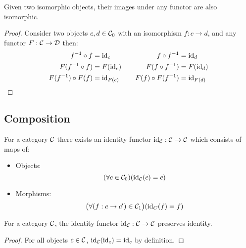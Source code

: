\begin{theorem}\label{thm:isomorphism_functor}

  Given two isomorphic objects, their images under any functor are also
  isomorphic.

  \begin{proof}
    Consider two objects $c,d \in \mathcal{C}_0$ with an isomorphism $f: c\to d$, and any
    functor $F:\mathcal{C} \to \mathcal{D}$ then:
    \[
      \begin{aligned}
        f^{-1}\circ f &= \mathrm{id}_c\\
        F(f^{-1}\circ f) &= F(\mathrm{id}_c)\\
        F(f^{-1})\circ F(f) &= \mathrm{id}_{F(c)}
      \end{aligned}
      \qquad
      \begin{aligned}
        f \circ f^{-1} &= \mathrm{id}_d\\
        F(f \circ f^{-1}) &= F(\mathrm{id}_d)\\
        F(f) \circ F(f^{-1}) &= \mathrm{id}_{F(d)}
      \end{aligned}
    \]
  \end{proof}
\end{theorem}

\subsection{Composition}
\begin{definition}\label{def:id_functor}

  For a category $\mathcal{C}$ there exists an identity functor $\mathrm{id}_{\mathcal{C}}: \mathcal{C} \to \mathcal{C}$ which
  consists of maps of:
  \parencite{adamek_herrlich_strecker:joy_cats}
  \begin{itemize}
    \item Objects:
      \[(\forall c \in \mathcal{C}_0)
        (\mathrm{id}_{\mathcal{C}}(c) = c)\]
    \item Morphisms:
      \[\big(\forall (f: c\to c') \in \mathcal{C}_1\big)
        (\mathrm{id}_C(f) = f)\]
  \end{itemize}
\end{definition}

\begin{theorem}
  For a category $\mathcal{C}$, the identity functor $\mathrm{id}_{\mathcal{C}}: \mathcal{C} \to \mathcal{C}$ preserves
  identity.

  \begin{proof}
    For all objects $c\in \mathcal{C}$, $\mathrm{id}_{\mathcal{C}}(\mathrm{id}_c) = \mathrm{id}_c$ by definition.
  \end{proof}
\end{theorem}

